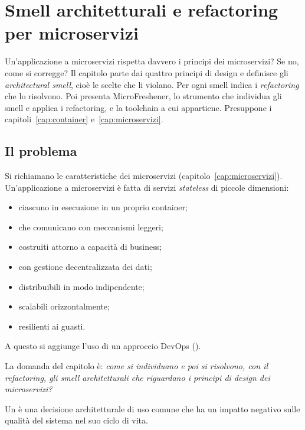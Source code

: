 \chapter{Smell architetturali e refactoring per microservizi}
\label{cap:smell}

\begin{inbreve}
Un'applicazione a microservizi rispetta davvero i principi dei microservizi? Se no, come si corregge? Il capitolo
parte dai quattro principi di design e definisce gli \emph{architectural smell}, cioè le scelte che li violano. Per
ogni smell indica i \emph{refactoring} che lo risolvono. Poi presenta MicroFreshener, lo strumento che individua gli
smell e applica i refactoring, e la toolchain a cui appartiene. Presuppone i capitoli~\ref{cap:container}
e~\ref{cap:microservizi}.
\end{inbreve}

\section{Il problema}
\label{sec:smell-problema}

Si richiamano le caratteristiche dei microservizi (capitolo~\ref{cap:microservizi}). Un'applicazione a
microservizi è fatta di servizi \emph{stateless} di piccole dimensioni:
\begin{itemize}
  \item ciascuno in esecuzione in un proprio container;
  \item che comunicano con meccanismi leggeri;
  \item costruiti attorno a capacità di business;
  \item con gestione decentralizzata dei dati;
  \item distribuibili in modo indipendente;
  \item scalabili orizzontalmente;
  \item resilienti ai guasti.
\end{itemize}
A questo si aggiunge l'uso di un approccio DevOps ().

La domanda del capitolo è: \emph{come si individuano e poi si risolvono, con il refactoring, gli smell architetturali
che riguardano i principi di design dei microservizi?}

\begin{definizione}
Un  è una decisione architetturale di uso comune che ha un impatto negativo sulle
qualità del sistema nel suo ciclo di vita.
\end{definizione}

